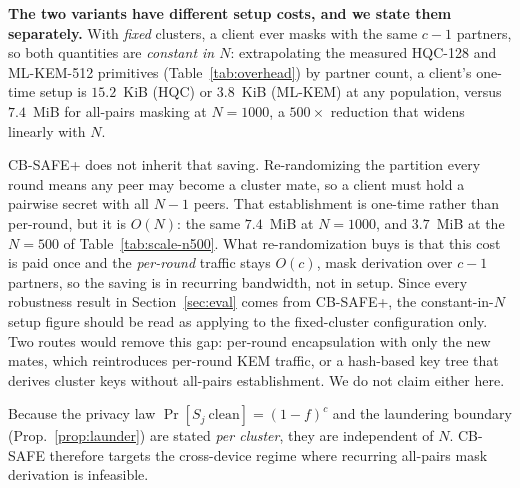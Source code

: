 \documentclass[lettersize,journal]{IEEEtran}
\begin{document}
\textbf{The two variants have different setup costs, and we state them separately.}
With \emph{fixed} clusters, a client ever masks with the same $c-1$ partners, so
both quantities are \emph{constant in $N$}: extrapolating the measured HQC-128 and
ML-KEM-512 primitives (Table~\ref{tab:overhead}) by partner count, a client's
one-time setup is $15.2$~KiB (HQC) or $3.8$~KiB (ML-KEM) at any population, versus
$7.4$~MiB for all-pairs masking at $N{=}1000$, a $500\times$ reduction that
widens linearly with $N$.

CB-SAFE+ does not inherit that saving. Re-randomizing the partition every round
means any peer may become a cluster mate, so a client must hold a pairwise secret
with all $N-1$ peers. That establishment is one-time rather than per-round, but it
is $O(N)$: the same $7.4$~MiB at $N{=}1000$, and $3.7$~MiB at the $N{=}500$ of
Table~\ref{tab:scale-n500}. What re-randomization buys is that this cost is paid
once and the \emph{per-round} traffic stays $O(c)$, mask derivation over $c-1$
partners, so the saving is in recurring bandwidth, not in setup. Since every
robustness result in Section~\ref{sec:eval} comes from CB-SAFE+, the
constant-in-$N$ setup figure should be read as applying to the fixed-cluster
configuration only. Two routes would remove this gap: per-round encapsulation with only the new
mates, which reintroduces per-round KEM traffic, or a hash-based key tree that
derives cluster keys without all-pairs establishment. We do not claim either here.

Because the privacy law $\Pr[S_j\ \mathrm{clean}]{=}(1-f)^c$ and the laundering
boundary (Prop.~\ref{prop:launder}) are stated \emph{per cluster}, they are
independent of $N$. CB-SAFE therefore targets the cross-device regime where
recurring all-pairs mask derivation is infeasible.
\end{document}

